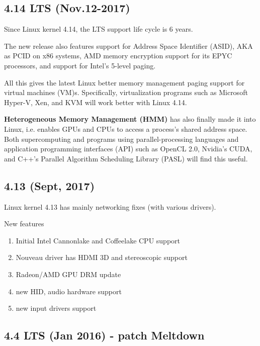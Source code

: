 \subsection{4.14 LTS (Nov.12-2017)}
\label{sec:HMM-heterogeneous-memory-management}

Since Linux kernel 4.14, the LTS support life cycle is 6 years.

The new release also features support for Address Space Identifier (ASID), AKA
as PCID on x86 systems, AMD memory encryption support for its EPYC processors,
and support for Intel's 5-level paging.

All this gives the latest Linux better memory management paging support for
virtual machines (VM)s. Specifically, virtualization programs such as Microsoft
Hyper-V, Xen, and KVM will work better with Linux 4.14. 

{\bf Heterogeneous Memory Management (HMM)} has also finally made it into Linux,
i.e. enables GPUs and CPUs to access a process's shared address space.
Both supercomputing and programs using parallel-processing languages and
application programming interfaces (API) such as OpenCL 2.0, Nvidia's CUDA, and
C++'s Parallel Algorithm Scheduling Library (PASL) will find this useful.  

\subsection{4.13 (Sept, 2017)}
\label{sec:linux-kernel-4.13}

Linux kernel 4.13 has mainly networking fixes (with various drivers). 

New features
\begin{enumerate}
  \item Initial Intel Cannonlake and Coffeelake CPU support
  
  \item Nouveau driver has HDMI 3D and stereoscopic support
  
  \item Radeon/AMD GPU DRM update
  
  \item new HID, audio hardware support
  
  \item new input drivers support
\end{enumerate}


\subsection{4.4 LTS (Jan 2016) - patch Meltdown}
\label{sec:linux-kernel-4.4}


